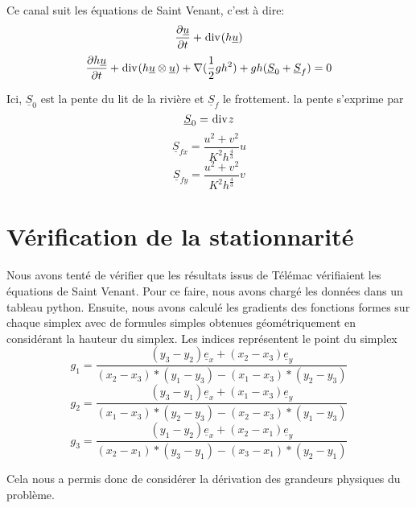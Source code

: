 \documentclass[a4paper,10pt]{article}
\begin{document}
  Ce canal suit les équations de Saint Venant, c'est à dire:
  \begin{equation}
    \frac{\partial \underline u}{\partial t}+\bdiv(h\underline u)
  \end{equation}
  \begin{equation}
    \frac{\partial h\underline u}{\partial t}+\bdiv(h\underline u \otimes \underline u)+\nabla(\frac 1 2 gh^2)+gh(\underline S_0 + \underline S_f)=0
  \end{equation}
  
  Ici, $\underline S_0$ est la pente du lit de la rivière et $\underline S_f$ le frottement.
  la pente s'exprime par
  \begin{equation}
   \underline S_0 = \bdiv z
  \end{equation}
  \begin{equation}
    \underline S_{fx}=\frac{u^2+v^2}{K^2h^{\frac 4 3}}u
  \end{equation}
  \begin{equation}
    \underline S_{fy}=\frac{u^2+v^2}{K^2h^{\frac 4 3}}v
  \end{equation}
  \section{Vérification de la stationnarité}
  Nous avons tenté de vérifier que les résultats issus de Télémac vérifiaient les équations de Saint Venant.
  Pour ce faire, nous avons chargé les données dans un tableau python. Ensuite, nous avons calculé les gradients des fonctions
  formes sur chaque simplex avec de formules simples obtenues géométriquement en considérant la hauteur du simplex.
  Les indices représentent le point du simplex
  \begin{equation}
    g_1=\frac{(y_3-y_2) \underline e_x + (x_2-x_3) \underline e_y}{(x_2-x_3)*(y_1-y_3)-(x_1-x_3)*(y_2-y_3)}
  \end{equation}
  \begin{equation}
    g_2=\frac{(y_3-y_1) \underline e_x + (x_1-x_3) \underline e_y}{(x_1-x_3)*(y_2-y_3)-(x_2-x_3)*(y_1-y_3)}
  \end{equation}
  \begin{equation}
    g_3=\frac{(y_1-y_2) \underline e_x + (x_2-x_1) \underline e_y}{(x_2-x_1)*(y_3-y_1)-(x_3-x_1)*(y_2-y_1)}
  \end{equation}
  
  Cela nous a permis donc de considérer la dérivation des grandeurs physiques du problème.
  
\end{document}
